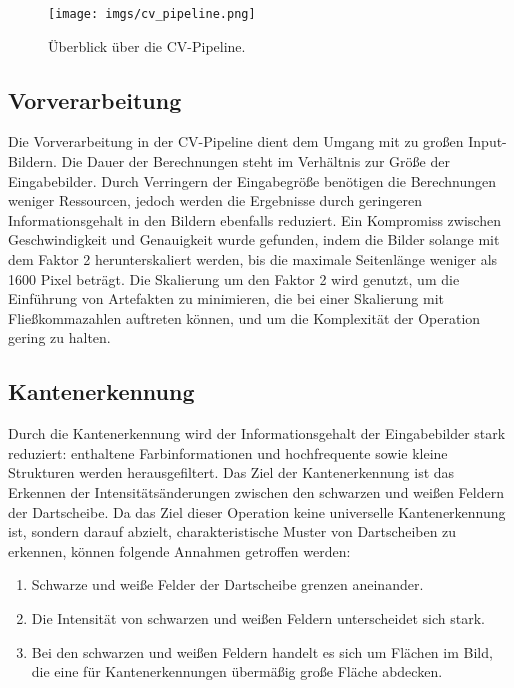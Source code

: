 \begin{figure}
    \centering
    \texttt{[image: imgs/cv\_pipeline.png]}
    \caption{Überblick über die CV-Pipeline.}
    \label{img:cv_pipeline}
\end{figure}

\subsection{Vorverarbeitung}
\label{sec:impl:cv:preprocessing}

Die Vorverarbeitung in der CV-Pipeline dient dem Umgang mit zu großen Input-Bildern. Die Dauer der Berechnungen steht im Verhältnis zur Größe der Eingabebilder. Durch Verringern der Eingabegröße benötigen die Berechnungen weniger Ressourcen, jedoch werden die Ergebnisse durch geringeren Informationsgehalt in den Bildern ebenfalls reduziert. Ein Kompromiss zwischen Geschwindigkeit und Genauigkeit wurde gefunden, indem die Bilder solange mit dem Faktor 2 herunterskaliert werden, bis die maximale Seitenlänge weniger als 1600 Pixel beträgt. Die Skalierung um den Faktor 2 wird genutzt, um die Einführung von Artefakten zu minimieren, die bei einer Skalierung mit Fließkommazahlen auftreten können, und um die Komplexität der Operation gering zu halten.

\subsection{Kantenerkennung}
\label{sec:impl:cv:edges}

Durch die Kantenerkennung wird der Informationsgehalt der Eingabebilder stark reduziert: enthaltene Farbinformationen und hochfrequente sowie kleine Strukturen werden herausgefiltert. Das Ziel der Kantenerkennung ist das Erkennen der Intensitätsänderungen zwischen den schwarzen und weißen Feldern der Dartscheibe. Da das Ziel dieser Operation keine universelle Kantenerkennung ist, sondern darauf abzielt, charakteristische Muster von Dartscheiben zu erkennen, können folgende Annahmen getroffen werden:

\begin{enumerate}
    \item Schwarze und weiße Felder der Dartscheibe grenzen aneinander.
    \item Die Intensität von schwarzen und weißen Feldern unterscheidet sich stark.
    \item Bei den schwarzen und weißen Feldern handelt es sich um Flächen im Bild, die eine für Kantenerkennungen übermäßig große Fläche abdecken.
\end{enumerate}


